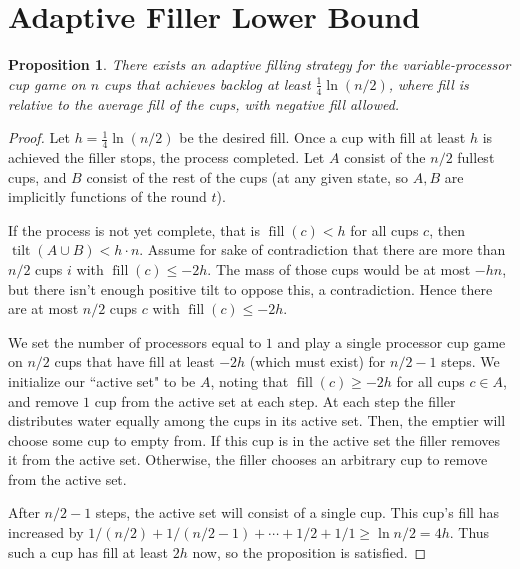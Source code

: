 \documentclass[twocolumn]{article}[10pt]
\DeclareMathOperator{\tilt}{\text{tilt}}
\DeclareMathOperator{\fil}{\text{fill}}
\newtheorem{proposition}{Proposition}
\begin{document}
\section{Adaptive Filler Lower Bound}\label{sec:adaptive}
\begin{proposition}
\label{prop:adaptiveBase}
  There exists an adaptive filling strategy for the variable-processor cup game
  on $n$ cups that achieves backlog at least $\frac{1}{4}\ln (n/2)$, where fill
  is relative to the average fill of the cups, with negative fill allowed.
\end{proposition}
\begin{proof}
  Let $h = \frac{1}{4}\ln (n/2)$ be the desired fill. Once a cup with fill at
  least $h$ is achieved the filler stops, the process completed.  
  Let $A$ consist of the $n/2$ fullest cups, and $B$ consist of the rest of the
  cups (at any given state, so $A, B$ are implicitly functions of the round
  $t$).

  If the process is not yet complete, that is $\fil(c) < h$ for all cups $c$,
  then $\tilt(A\cup B) < h\cdot n$. Assume for
  sake of contradiction that there are more than $n/2$ cups $i$ with $\fil(c)
  \le -2h$. The mass of those cups would be at most $-hn$, but there isn't
  enough positive tilt to oppose this, a contradiction. Hence there are at most
  $n/2$ cups $c$ with $\fil(c) \le -2h$. 

  We set the number of processors equal to $1$ and play a single processor cup
  game on $n/2$ cups that have fill at least $-2h$ (which must exist) for $n/2
  -1$ steps. We initialize our ``active set" to be $A$, noting that $\fil(c)
  \ge -2h$ for all cups $c\in A$, and remove $1$ cup from the active set at
  each step.
  At each step the filler distributes water equally among the cups in its
  active set. Then, the emptier will choose some cup to empty from. If this cup
  is in the active set the filler removes it from the active set. Otherwise, the
  filler chooses an arbitrary cup to remove from the active set.

  After $n/2-1$ steps, the active set will consist of a single cup. This cup's
  fill has increased by $1/(n/2) + 1/(n/2 - 1) + \cdots + 1/2 + 1/1
  \ge \ln n/2 = 4h$. Thus such a cup has fill at least $2h$ now, so the
  proposition is satisfied.
\end{proof}
\end{document}
